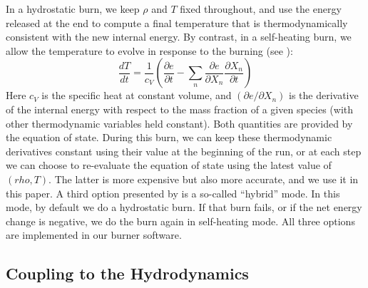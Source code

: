 \documentclass[twocolumn,numberedappendix]{../aastex6}
\begin{document}
In a hydrostatic burn, we keep $\rho$ and $T$ fixed throughout, and use
the energy released at the end to compute a final temperature that is
thermodynamically consistent with the new internal energy. By contrast,
in a self-heating burn, we allow the temperature to evolve in response
to the burning (see \citet{maestro3}):
\begin{equation}
  \frac{dT}{dt} = \frac{1}{c_V}\left(\frac{\partial e}{\partial t} - \sum_n \frac{\partial e}{\partial X_n}\frac{\partial X_n}{\partial t}\right)
\end{equation}
Here $c_V$ is the specific heat at constant volume, and $(\partial e/\partial X_n)$
is the derivative of the internal energy with respect to the mass fraction of a given
species (with other thermodynamic variables held constant). Both quantities are provided by the
equation of state. During this burn, we can keep these thermodynamic
derivatives constant using their value at the beginning of the run, or at each step we
can choose to re-evaluate the equation of state using the latest value of $(rho, T)$.
The latter is more expensive but also more accurate, and we use it in this paper.
A third option presented by \citet{raskin:2010} is a so-called ``hybrid'' mode.
In this mode, by default we do a hydrostatic burn. If that burn fails, or if the net
energy change is negative, we do the burn again in self-heating mode. All three options
are implemented in our burner software.

\subsection{Coupling to the Hydrodynamics}
\label{sec:hydrocoupling}
\end{document}
